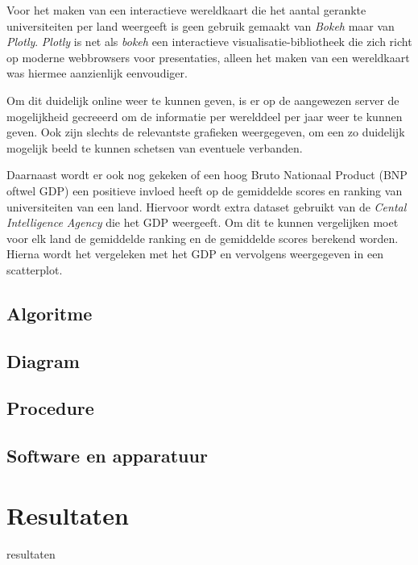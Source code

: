 \documentclass{uva-inf-article}
\begin{document}
Voor het maken van een interactieve wereldkaart die het aantal gerankte universiteiten per land weergeeft is geen gebruik gemaakt van \textit{Bokeh} maar van \textit{Plotly}. \textit{Plotly} is net als \textit{bokeh} een interactieve visualisatie-bibliotheek die zich richt op moderne webbrowsers voor presentaties, alleen het maken van een wereldkaart was hiermee aanzienlijk eenvoudiger.

Om dit duidelijk online weer te kunnen geven, is er op de aangewezen server de mogelijkheid gecreeerd om de informatie per werelddeel per jaar weer te kunnen geven. Ook zijn slechts de relevantste grafieken weergegeven, om een zo duidelijk mogelijk beeld te kunnen schetsen van eventuele verbanden.

Daarnaast wordt er ook nog gekeken of een hoog Bruto Nationaal Product (BNP oftwel GDP) een positieve invloed heeft op de gemiddelde scores en ranking van universiteiten van een land. Hiervoor wordt extra dataset gebruikt van de \textit{Cental Intelligence Agency} \cite{CIA} die het GDP weergeeft.
Om dit te kunnen vergelijken moet voor elk land de gemiddelde ranking en de gemiddelde scores berekend worden. Hierna wordt het vergeleken met het GDP en vervolgens weergegeven in een scatterplot.

\subsection{Algoritme}
\subsection{Diagram}
\subsection{Procedure}
\subsection{Software en apparatuur}


\section{Resultaten}
resultaten
\end{document}
